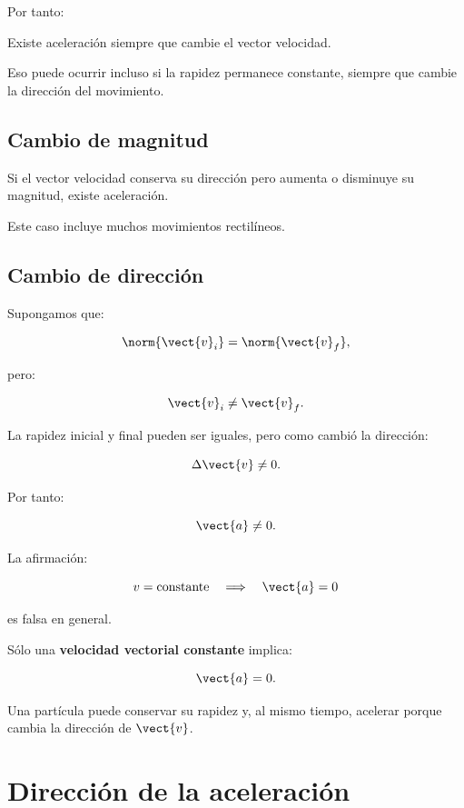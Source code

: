 Por tanto:

\begin{idea}
Existe aceleración siempre que cambie el vector velocidad.

Eso puede ocurrir incluso si la rapidez permanece constante, siempre que cambie
la dirección del movimiento.
\end{idea}


\subsection{Cambio de magnitud}

Si el vector velocidad conserva su dirección pero aumenta o disminuye su
magnitud, existe aceleración.

Este caso incluye muchos movimientos rectilíneos.


\subsection{Cambio de dirección}

Supongamos que:

\[
\norm{\vect{v}_i}
=
\norm{\vect{v}_f},
\]

pero:

\[
\vect{v}_i\neq\vect{v}_f.
\]

La rapidez inicial y final pueden ser iguales, pero como cambió la dirección:

\[
\Delta\vect{v}\neq0.
\]

Por tanto:

\[
\vect{a}\neq0.
\]

\begin{errorfrecuente}
La afirmación:

\[
v=\text{constante}
\quad\Longrightarrow\quad
\vect{a}=0
\]

es falsa en general.

Sólo una \textbf{velocidad vectorial constante} implica:

\[
\vect{a}=0.
\]

Una partícula puede conservar su rapidez y, al mismo tiempo, acelerar porque
cambia la dirección de \(\vect{v}\).
\end{errorfrecuente}


\section{Dirección de la aceleración}

